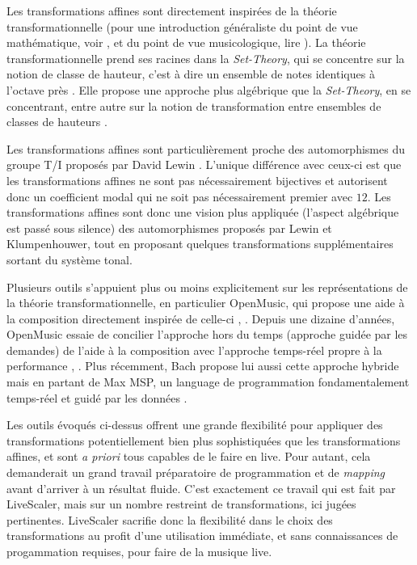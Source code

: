 Les transformations affines sont directement inspirées de la théorie transformationnelle  (pour une introduction généraliste du point de vue mathématique, voir \cite{andreatta2008calcul}, et du point de vue musicologique, lire \cite{andreatta2014introduction}). La théorie transformationnelle prend ses racines dans la \emph{Set-Theory}, qui se concentre sur la notion de classe de hauteur, c'est à dire un ensemble de notes identiques à l'octave près \cite{forte1973structure}. Elle propose une approche plus algébrique que la \emph{Set-Theory}, en se concentrant, entre autre sur la notion de transformation entre ensembles de classes de hauteurs \cite{lewin1987generalized}. 

Les transformations affines sont particulièrement proche des automorphismes du groupe T/I proposés par David Lewin \cite{lewin1990klumpenhouwer}. L'unique différence avec ceux-ci est que les transformations affines ne sont pas nécessairement bijectives et autorisent donc un coefficient modal qui ne soit pas nécessairement premier avec $12$. Les transformations affines sont donc  une vision plus appliquée (l'aspect algébrique est passé sous silence) des automorphismes proposés par Lewin et Klumpenhouwer, tout en proposant quelques transformations supplémentaires sortant du système tonal.


Plusieurs outils s'appuient plus ou moins explicitement sur les représentations de la théorie transformationnelle, en particulier OpenMusic, qui propose une aide à la composition directement inspirée de celle-ci \cite{andreatta2003implementing}, \cite{andreatta2003formalisation}. Depuis une dizaine d'années, OpenMusic essaie de concilier l'approche hors du temps (approche guidée par les demandes) de l'aide à la composition avec l'approche temps-réel propre à la performance \cite{bresson2014reactive}, \cite{bresson2017next}. Plus récemment, Bach propose lui aussi cette approche hybride mais en partant de Max MSP, un language de programmation fondamentalement temps-réel et guidé par les données \cite{agostini2021programming}.

Les outils évoqués ci-dessus offrent une grande flexibilité pour appliquer des transformations potentiellement bien plus sophistiquées que les transformations affines, et sont \emph{a priori} tous capables de le faire en live. Pour autant, cela demanderait un grand travail préparatoire de programmation et de \emph{mapping} avant d'arriver à un résultat fluide. C'est exactement ce travail qui est fait par LiveScaler, mais sur un nombre restreint de transformations, ici jugées pertinentes. LiveScaler sacrifie donc la flexibilité dans le choix des transformations au profit d'une utilisation immédiate, et sans connaissances de progammation requises, pour faire de la musique live.


